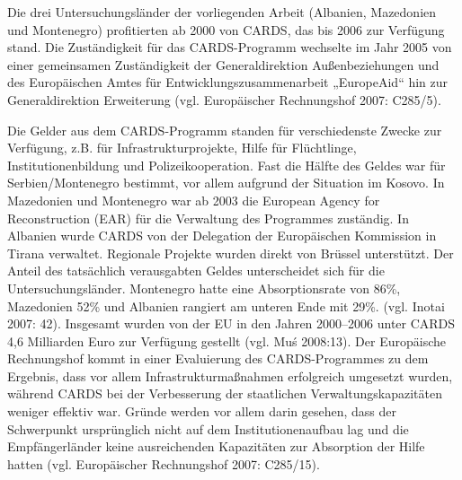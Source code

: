 Die drei Untersuchungsländer der vorliegenden Arbeit (Albanien, Mazedonien und Montenegro) profitierten ab 2000 von CARDS, das bis 2006 zur Verfügung stand. Die Zuständigkeit für das CARDS-Programm wechselte im Jahr 2005 von einer gemeinsamen Zuständigkeit der Generaldirektion Außenbeziehungen und des Europäischen Amtes für Entwicklungszusammenarbeit „EuropeAid“ hin zur Generaldirektion Erweiterung (vgl. Europäischer Rechnungshof 2007: C285/5).\par
Die Gelder aus dem CARDS-Programm standen für verschiedenste Zwecke zur Verfügung, z.B. für Infrastrukturprojekte, Hilfe für Flüchtlinge, Institutionenbildung und Polizeikooperation. Fast die Hälfte des Geldes war für Serbien/Montenegro bestimmt, vor allem aufgrund der Situation im Kosovo. In Mazedonien und Montenegro war ab 2003 die European Agency for Reconstruction (EAR) für die Verwaltung des Programmes zuständig. In Albanien wurde CARDS von der Delegation der Europäischen Kommission in Tirana verwaltet. Regionale Projekte wurden direkt von Brüssel unterstützt. Der Anteil des tatsächlich verausgabten Geldes unterscheidet sich für die Untersuchungsländer. Montenegro hatte eine Absorptionsrate von 86\%, Mazedonien 52\% und Albanien rangiert am unteren Ende mit 29\%. (vgl. Inotai 2007: 42). Insgesamt wurden von der EU in den Jahren 2000–2006 unter CARDS 4,6 Milliarden Euro zur Verfügung gestellt (vgl. Muś 2008:13). Der Europäische Rechnungshof kommt in einer Evaluierung des CARDS-Programmes zu dem Ergebnis, dass vor allem Infrastrukturmaßnahmen erfolgreich umgesetzt wurden, während CARDS bei der Verbesserung der staatlichen Verwaltungskapazitäten weniger effektiv war. Gründe werden vor allem darin gesehen, dass der Schwerpunkt ursprünglich nicht auf dem Institutionenaufbau lag und die Empfängerländer keine ausreichenden Kapazitäten zur Absorption der Hilfe hatten (vgl. Europäischer Rechnungshof 2007: C285/15).
